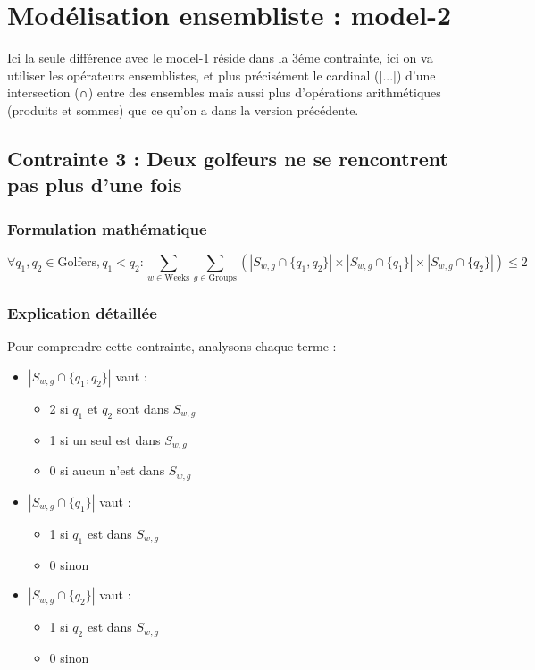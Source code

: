 \documentclass{article}
\begin{document}
\section*{Mod\'elisation ensembliste : model-2}

Ici la seule différence avec le model-1 réside dans la 3éme contrainte, ici on va utiliser les opérateurs ensemblistes, et plus précisément le cardinal (|...|) d'une intersection (∩) entre des ensembles mais aussi plus d'opérations arithmétiques (produits et sommes) que ce qu'on a dans la version précédente.

\subsection*{Contrainte 3 : Deux golfeurs ne se rencontrent pas plus d'une fois}

\subsubsection*{Formulation mathématique}
\[
\forall q_1,q_2 \in \text{Golfers}, q_1 < q_2 : \sum_{w \in \text{Weeks}} \sum_{g \in \text{Groups}} (|S_{w,g} \cap \{q_1,q_2\}| \times |S_{w,g} \cap \{q_1\}| \times |S_{w,g} \cap \{q_2\}|) \leq 2
\]

\subsubsection*{Explication détaillée}
Pour comprendre cette contrainte, analysons chaque terme :

\begin{itemize}
   \item $|S_{w,g} \cap \{q_1,q_2\}|$ vaut :
   \begin{itemize}
       \item 2 si $q_1$ et $q_2$ sont dans $S_{w,g}$
       \item 1 si un seul est dans $S_{w,g}$
       \item 0 si aucun n'est dans $S_{w,g}$
   \end{itemize}
   
   \item $|S_{w,g} \cap \{q_1\}|$ vaut :
   \begin{itemize}
       \item 1 si $q_1$ est dans $S_{w,g}$
       \item 0 sinon
   \end{itemize}
   
   \item $|S_{w,g} \cap \{q_2\}|$ vaut :
   \begin{itemize}
       \item 1 si $q_2$ est dans $S_{w,g}$
       \item 0 sinon
   \end{itemize}
\end{itemize}
\end{document}
